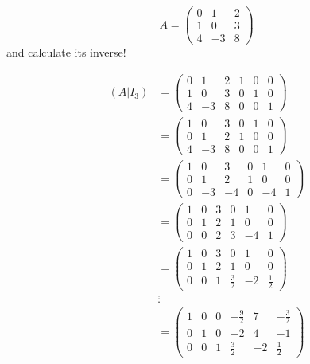 \documentclass[12pt]{report}
\theoremstyle{definition}
\begin{document}
\begin{ex}
    \[
        A = \begin{pmatrix}
            0 & 1 & 2 \\
            1 & 0 & 3 \\
            4 & -3 & 8
        \end{pmatrix} 
    \]and calculate its inverse!

    \[
            \begin{align*}
                (A|I_3) & = \begin{pmatrix}
                    0 & 1 & 2 & 1 & 0 & 0 \\
                    1 & 0 & 3 & 0 & 1 & 0 \\
                    4 & -3 & 8 & 0 & 0 & 1
                \end{pmatrix} \\
                        & = \begin{pmatrix}
                            1 & 0 & 3 & 0 & 1 & 0 \\
                            0 & 1 & 2 & 1 & 0 & 0 \\
                            4 & -3 & 8 & 0 & 0 & 1
                        \end{pmatrix} \\
                        & = \begin{pmatrix}
                            1 & 0 & 3 & 0 & 1 & 0 \\
                            0 & 1 & 2 & 1 & 0 & 0 \\
                            0 & -3 & -4 & 0 & -4 & 1
                        \end{pmatrix} \\
                        & = \begin{pmatrix}
                            1 & 0 & 3 & 0 & 1 & 0 \\
                            0 & 1 & 2 & 1 & 0 & 0 \\
                            0 & 0 & 2 & 3 & -4 & 1
                        \end{pmatrix} \\
                        & = \begin{pmatrix}
                            1 & 0 & 3 & 0 & 1 & 0 \\
                            0 & 1 & 2 & 1 & 0 & 0 \\
                            0 & 0 & 1 & \frac{3}{2} & -2 & \frac{1}{2}
                        \end{pmatrix} \\
                        & \vdots \\
                        & = \begin{pmatrix}
                            1 & 0 & 0 & -\frac{9}{2} & 7 & -\frac{3}{2} \\
                            0 & 1 & 0 & -2 & 4 & -1 \\
                            0 & 0 & 1 & \frac{3}{2} & -2 & \frac{1}{2}
                        \end{pmatrix} 
            \end{align*}
        \]
\end{ex}
\end{document}
